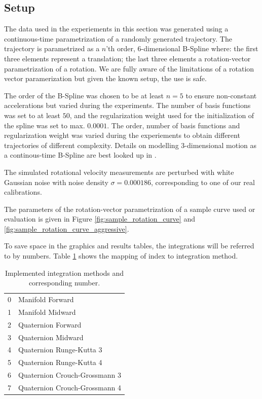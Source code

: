 \documentclass[10pt,a4paper]{article}
\numberwithin{equation}{section}
\begin{document}
\subsection{Setup}

The data used in the experiements in this section was generated using a continuous-time parametrization of a randomly generated trajectory.
The trajectory is parametrized as a $n$'th order, 6-dimensional B-Spline where: the first three elements represent a translation; the last three elements a rotation-vector parametrization of a rotation.
We are fully aware of the limitations of a rotation vector paramerization but given the known setup, the use is safe.

The order of the B-Spline was chosen to be at least $n = 5$ to ensure non-constant accelerations but varied during the experiments.
The number of basis functions was set to at least $50$, and the regularization weight used for the initialization of the spline was set to max. $0.0001$.
The order, number of basis functions and regularization weight was varied during the experiements to obtain different trajectories of different complexity.
Details on modelling 3-dimensional motion as a continous-time B-Spline are best looked up in \cite{furgale}.

The simulated rotational velocity measurements are perturbed with white Gaussian noise with noise density $\sigma = 0.000186$, corresponding to one of our real calibrations.

The parameters of the rotation-vector parametrization of a sample curve used or evaluation is given in Figure \ref{fig:sample_rotation_curve} and \ref{fig:sample_rotation_curve_aggressive}.

To save space in the graphics and results tables, the integrations will be referred to by numbers. Table \ref{tbl:method_number} shows the mapping of index to integration method.

\begin{table}
\begin{center}
\begin{tabular}{ l | l }
0  & Manifold Forward \\
1  & Manifold Midward \\
2  & Quaternion Forward \\
3  & Quaternion Midward \\
4  & Quaternion Runge-Kutta 3 \\
5  & Quaternion Runge-Kutta 4 \\
6  & Quaternion Crouch-Grossmann 3\\
7  & Quaternion Crouch-Grossmann 4
\end{tabular}
\end{center}
\caption{Implemented integration methods and corresponding number.}
\label{tbl:method_number}
\end{table}
\end{document}
